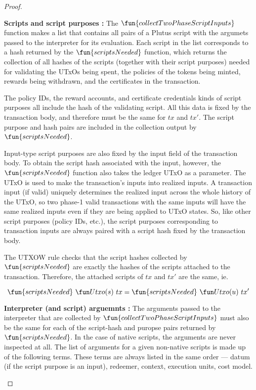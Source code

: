 \begin{property}
\begin{proof}
\begin{itemize}
    \textbf{Scripts and script purposes : } The $\fun{collectTwoPhaseScriptInputs}$
    function makes a list that contains all pairs of a Plutus script
    with the argumets passed to the interpreter for its evaluation.
    Each script in the list corresponds to a hash returned by
    the $\fun{scriptsNeeded}$ function, which returns the collection of
    all hashes of the scripts (together with their script purposes) needed for validating the UTxOs being spent,
    the policies of the tokens being minted, rewards being withdrawn, and the certificates
    in the transaction.

    The policy IDs, the reward accounts, and certificate credentials kinds of script purposes all include
    the hash of the validating script. All this data is fixed by the transaction body,
    and therefore must be the same for $tx$ and $tx'$. The script purpose and hash pairs are
    included in the collection output by $\fun{scriptsNeeded}$.

    Input-type script purposes are also fixed by the input field of the transaction body.
    To obtain the script hash associated with the input, however,
    the $\fun{scriptsNeeded}$ function also takes the ledger UTxO as a parameter.
    The UTxO is used to make the transaction's inputs into realized inputs.
    A transaction input (if valid) uniquely determines the realized input across the whole
    history of the UTxO, so two phase-1 valid transactions with the same inputs
    will have the same realized inputs even if they are being applied to UTxO states.
    So, like other script purposes (policy IDs, etc.), the script purposes corresponding to
    transaction inputs are always paired with a script hash fixed by the transaction body.

    The UTXOW rule checks that the script hashes collected by $\fun{scriptsNeeded}$
    are exactly the hashes of the scripts attached to the transaction. Therefore, the
    attached scripts of $tx$ and $tx'$ are the same, ie.

    \[ \fun{scriptsNeeded}~\Utxo(s)~tx = \fun{scriptsNeeded}~\Utxo(u)~tx' \]

    \textbf{Interpreter (and script) arguemnts : } The arguments passed to the interpreter
    that are collected
    by $\fun{collectTwoPhaseScriptInputs}$ must also be the same for each
    of the script-hash and puropse pairs returned by $\fun{scriptsNeeded}$.
    In the case of native scripts, the arguments are never inspected at all.
    The list of arguments for a given non-native scripts is made up of the following
    terms. These terms are
    always listed in the same order --- datum (if the script purpose is an input), redeemer, context, execution units,
    cost model.


\end{itemize}
\end{proof}
\end{property}
